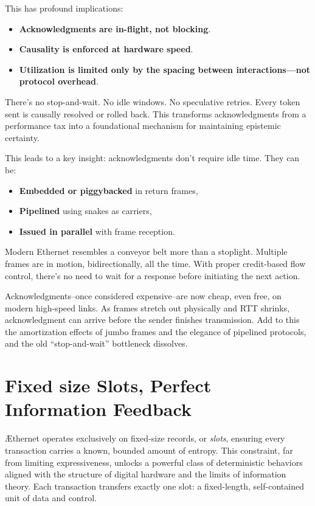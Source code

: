 \documentclass[../OAE-SPEC-MAIN.tex]{subfiles}
\begin{document}
This has profound implications:

\begin{itemize}
  \item \textbf{Acknowledgments are in-flight, not blocking}.
  \item \textbf{Causality is enforced at hardware speed}.
  \item \textbf{Utilization is limited only by the spacing between interactions—not protocol overhead}.
\end{itemize}

There’s no stop-and-wait. No idle windows. No speculative retries. Every token sent is causally resolved or rolled back. This transforms acknowledgments from a performance tax into a foundational mechanism for maintaining epistemic certainty.

This leads to a key insight: acknowledgments don’t require idle time. They can be:

\begin{itemize}
  \item \textbf{Embedded or piggybacked} in return frames,
  \item \textbf{Pipelined} using snakes as carriers,
  \item \textbf{Issued in parallel} with frame reception.
\end{itemize}

Modern Ethernet resembles a conveyor belt more than a stoplight. Multiple frames are in motion, bidirectionally, all the time. With proper credit-based flow control, there’s no need to wait for a response before initiating the next action.

Acknowledgments--once considered expensive--are now cheap, even free, on modern high-speed links. As frames stretch out physically and RTT shrinks, acknowledgment can arrive before the sender finishes transmission. Add to this the amortization effects of jumbo frames and the elegance of pipelined protocols, and the old “stop-and-wait” bottleneck dissolves.








\section{Fixed size Slots, Perfect Information Feedback}

\AE thernet operates exclusively on fixed-size records, or \emph{slots}, ensuring every transaction carries a known, bounded amount of entropy. This constraint, far from limiting expressiveness, unlocks a powerful class of deterministic behaviors aligned with the structure of digital hardware and the limits of information theory. Each transaction transfers exactly one slot: a fixed-length, self-contained unit of data and control.
\end{document}
